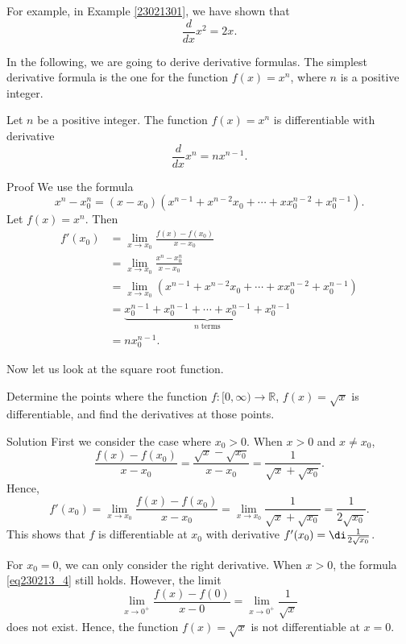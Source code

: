 For example, in Example \ref{23021301}, we have shown that
\[\frac{d}{dx} x^2=2x.\]

In the following, we are going to derive derivative formulas. 
The simplest   derivative formula is the one for the function $f(x)=x^n$, where $n$ is a positive integer.
\begin{proposition}{}
Let $n$ be a positive integer. The function $f(x)=x^n$ is differentiable with derivative 
\[\frac{d}{dx}x^n=nx^{n-1}.\]
\end{proposition}
\begin{myproof}{Proof}
We use the formula
\[x^n-x_0^n=(x-x_0)(x^{n-1}+x^{n-2}x_0+\cdots+xx_0^{n-2}+x_0^{n-1}).\]
Let $f(x)=x^n$. Then\bp
\begin{align*}
 f'(x_0)&=\lim_{x\to x_0}\frac{f(x)-f(x_0)}{x-x_0}\\
&=\lim_{x\to x_0}\frac{x^n-x_0^n}{x-x_0}\\
&=\lim_{x\to x_0}\left(x^{n-1}+x^{n-2}x_0+\cdots+xx_0^{n-2}+x_0^{n-1}\right)\\
&=\underbrace{x_0^{n-1}+x_0^{n-1}+\cdots+x_0^{n-1}+x_0^{n-1}}_{n \;\text{terms}}\\
&=nx_0^{n-1}.
\end{align*}
\end{myproof}

Now let us look at the square root function.
\begin{example}{}
Determine the points where the function $f:[0, \infty)\to\mathbb{R}$, $f(x)=\sqrt{x}$ is differentiable, and find the derivatives at those points.
\end{example}
\begin{solution}{Solution}
First we consider the case where $x_0>0$. When $x>0$ and $x\neq x_0$,
\begin{equation}\label{eq230213_4}
\frac{f(x)-f(x_0)}{x-x_0}=\frac{\sqrt{x}-\sqrt{x_0}}{x-x_0}=\frac{1}{\sqrt{x}+\sqrt{x_0}}.
\end{equation}
Hence, 
\[f'(x_0)=\lim_{x\to x_0}\frac{f(x)-f(x_0)}{x-x_0}=\lim_{x\to x_0}\frac{1}{\sqrt{x}+\sqrt{x_0}}=\frac{1}{2\sqrt{x_0}}.\]
This shows that $f$ is differentiable at $x_0$ with derivative $f'(x_0)=\di \frac{1}{2\sqrt{x_0}}$.

For $x_0=0$, we can only consider the right derivative. When $x>0$,
the formula \eqref{eq230213_4} still holds. However, the limit
\[\lim_{x\rightarrow 0^+}\frac{f(x)-f(0)}{x-0}=\lim_{x\to 0^+}\frac{1}{\sqrt{x}}\] does not exist. Hence, the function $f(x)=\sqrt{x}$ is not differentiable at $x=0$.

\end{solution}

